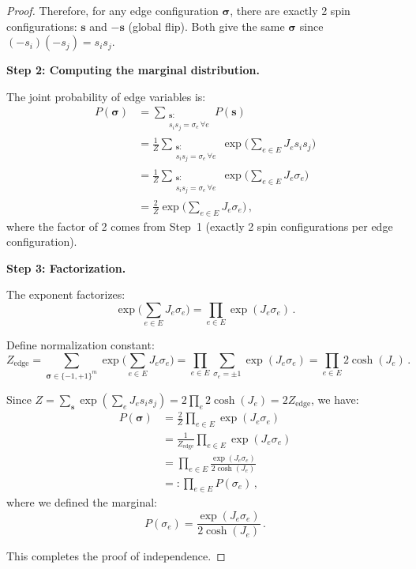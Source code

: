 \documentclass[11pt]{article}
\theoremstyle{definition}
\theoremstyle{remark}
\begin{document}
\begin{proof}
Therefore, for any edge configuration $\boldsymbol{\sigma}$, there are
exactly 2 spin configurations: $\mathbf{s}$ and $-\mathbf{s}$
(global flip). Both give the same $\boldsymbol{\sigma}$ since
$(-s_i)(-s_j) = s_i s_j$.

\textbf{Step 2: Computing the marginal distribution.}

The joint probability of edge variables is:
\begin{align}
P(\boldsymbol{\sigma})
&= \sum_{\substack{\mathbf{s}:\\ s_i s_j = \sigma_e\, \forall e}} P(\mathbf{s})
\nonumber\\
&= \frac{1}{Z} \sum_{\substack{\mathbf{s}:\\ s_i s_j = \sigma_e\, \forall e}}
\exp\Biggl(\sum_{e \in E} J_e s_i s_j\Biggr)
\nonumber\\
&= \frac{1}{Z} \sum_{\substack{\mathbf{s}:\\ s_i s_j = \sigma_e\, \forall e}}
\exp\Biggl(\sum_{e \in E} J_e \sigma_e\Biggr)
\nonumber\\
&= \frac{2}{Z} \exp\Biggl(\sum_{e \in E} J_e \sigma_e\Biggr)\,,
\label{eq:joint-edge-prob}
\end{align}
where the factor of 2 comes from Step~1 (exactly 2 spin configurations per
edge configuration).

\textbf{Step 3: Factorization.}

The exponent factorizes:
\begin{equation}
\exp\Biggl(\sum_{e \in E} J_e \sigma_e\Biggr)
= \prod_{e \in E} \exp(J_e \sigma_e)\,.
\end{equation}

Define normalization constant:
\begin{equation}
Z_{\text{edge}} = \sum_{\boldsymbol{\sigma} \in \{-1,+1\}^m}
\exp\Biggl(\sum_{e \in E} J_e \sigma_e\Biggr)
= \prod_{e \in E} \sum_{\sigma_e = \pm 1} \exp(J_e \sigma_e)
= \prod_{e \in E} 2\cosh(J_e)\,.
\end{equation}

Since $Z = \sum_{\mathbf{s}} \exp(\sum_e J_e s_i s_j)
= 2 \prod_e 2\cosh(J_e) = 2 Z_{\text{edge}}$, we have:
\begin{align}
P(\boldsymbol{\sigma})
&= \frac{2}{Z} \prod_{e \in E} \exp(J_e \sigma_e)
\nonumber\\
&= \frac{1}{Z_{\text{edge}}} \prod_{e \in E} \exp(J_e \sigma_e)
\nonumber\\
&= \prod_{e \in E} \frac{\exp(J_e \sigma_e)}{2\cosh(J_e)}
\nonumber\\
&=: \prod_{e \in E} P(\sigma_e)\,,
\label{eq:factorized-edge-prob}
\end{align}
where we defined the marginal:
\begin{equation}
\label{eq:edge-marginal-definition}
P(\sigma_e) = \frac{\exp(J_e \sigma_e)}{2\cosh(J_e)}\,.
\end{equation}

This completes the proof of independence.
\end{proof}
\end{document}
